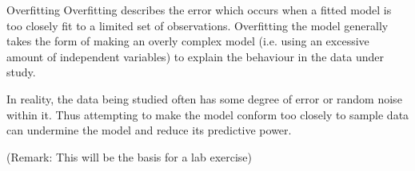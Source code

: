 Overfitting 
Overfitting describes the error which occurs when a fitted model is too 
closely fit to a limited set of observations. Overfitting the model generally 
takes the form of making an overly complex model (i.e. using an 
excessive amount of independent variables) to explain the behaviour in 
the data under study. 
 
In reality, the data being studied often has some degree of error or 
random noise within it. Thus attempting to make the model conform too 
closely to sample data can undermine the model and reduce its predictive 
power. 
 
(Remark: This will be the basis for a lab exercise) 
 

